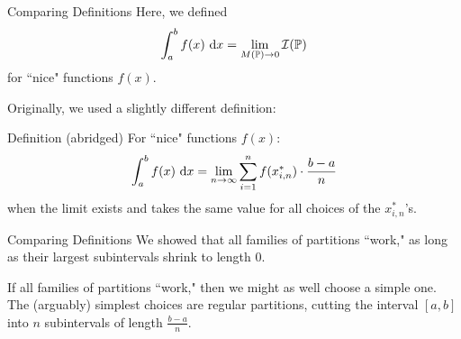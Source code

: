  \begin{frame}{Comparing Definitions}
Here, we defined
  \[\int_a^b f(x)~\text{d} x = \lim_{M(\mathbb P)\to 0}\mathcal I(\mathbb P)\]
  for ``nice" functions $f(x)$. 
  
Originally, we used a slightly different definition:
\begin{block}{Definition  (abridged)}
For ``nice" functions $f(x)$:
  \[\int_a^b f(x)~\text{d} x = \lim_{n \to \infty}\sum_{i=1}^n f(x_{i,n}^*)\cdot\frac{b-a}{n}\]
  when the limit exists and takes the same value for all choices of the $x_{i,n}^*$'s.
  \end{block}
 \end{frame}
\begin{frame}{Comparing Definitions}
We showed that \alert{all} families of partitions ``work," as long as their largest subintervals shrink to length 0.
\vfill

If all families of partitions ``work," then we might as well choose a simple one. The (arguably) simplest choices are regular partitions, cutting the interval $[a,b]$ into $n$ subintervals of length $\frac{b-a}{n}$.
\end{frame}
